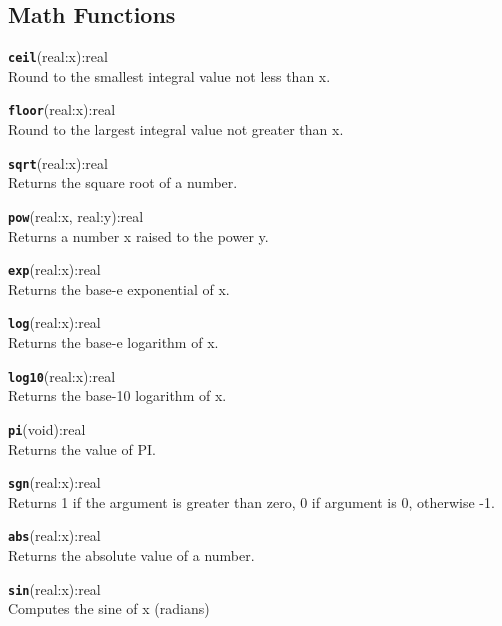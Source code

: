 \subsection{Math Functions}
\texttt{{\large\textbf{ceil}}}\textsf{(real:x):real}\\
 Round to the smallest integral value not less than x.

\hrulefill

\texttt{{\large\textbf{floor}}}\textsf{(real:x):real}\\
 Round to the largest integral value not greater than x.

\hrulefill

\texttt{{\large\textbf{sqrt}}}\textsf{(real:x):real}\\
 Returns the square root of a number.

\hrulefill

\texttt{{\large\textbf{pow}}}\textsf{(real:x, real:y):real}\\
 Returns a number x raised to the power y.

\hrulefill

\texttt{{\large\textbf{exp}}}\textsf{(real:x):real}\\
 Returns the base-e exponential of x.

\hrulefill

\texttt{{\large\textbf{log}}}\textsf{(real:x):real}\\
 Returns the base-e logarithm of x.

\hrulefill

\texttt{{\large\textbf{log10}}}\textsf{(real:x):real}\\
 Returns the base-10 logarithm of x.

\hrulefill

\texttt{{\large\textbf{pi}}}\textsf{(void):real}\\
 Returns the value of PI.

\hrulefill

\texttt{{\large\textbf{sgn}}}\textsf{(real:x):real}\\
 Returns 1 if the argument is greater than zero, 0 if argument is 0, otherwise -1.

\hrulefill

\texttt{{\large\textbf{abs}}}\textsf{(real:x):real}\\
 Returns the absolute value of a number.

\hrulefill

\texttt{{\large\textbf{sin}}}\textsf{(real:x):real}\\
 Computes the sine of x (radians)


